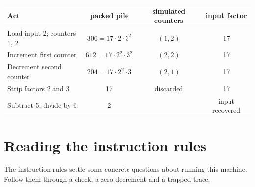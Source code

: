 \documentclass[11pt,twoside]{article}
\theoremstyle{thielethm}
\theoremstyle{thieledef}
\theoremstyle{thieledef}
\theoremstyle{thieledef}
\theoremstyle{thielethm}
\theoremstyle{thieleobs}
\theoremstyle{thielethm}
\begin{document}
\begin{center}
\small
\begin{tabular}{@{}lccc@{}}
Act & packed pile & simulated counters & input factor \\ \hline
Load input 2; counters 1, 2 & $306=17\cdot2\cdot3^2$ & $(1,2)$ & 17 \\
Increment first counter & $612=17\cdot2^2\cdot3^2$ & $(2,2)$ & 17 \\
Decrement second counter & $204=17\cdot2^2\cdot3$ & $(2,1)$ & 17 \\
Strip factors 2 and 3 & 17 & discarded & 17 \\
Subtract 5; divide by 6 & 2 & & input recovered \\ \hline
\end{tabular}
\end{center}


\section{Reading the instruction rules}

The instruction rules settle some concrete questions about running this machine. Follow
them through a check, a zero decrement and a trapped trace.
\end{document}
